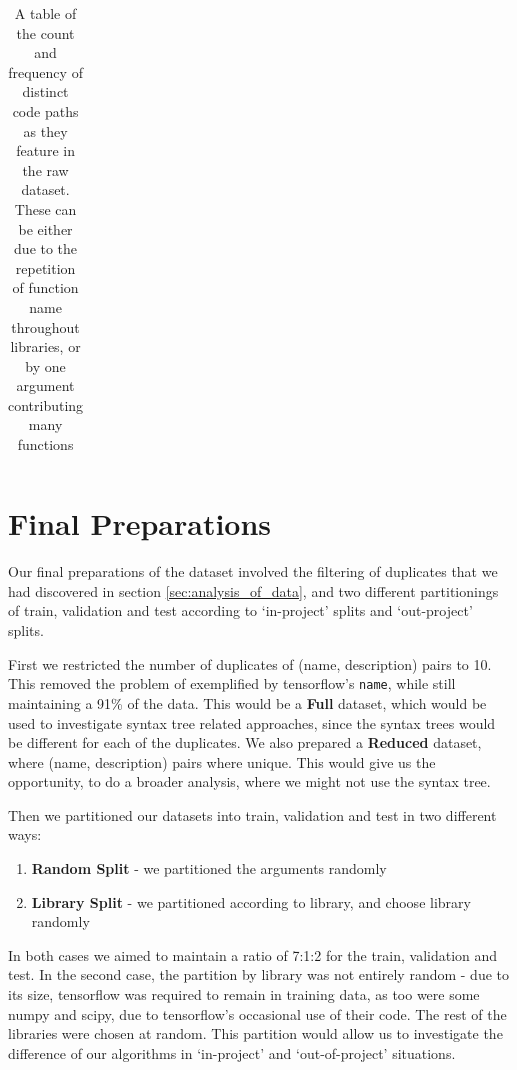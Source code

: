 \begin{table}[p]
\begin{tabular}{c | c | c  }
    \end{tabular}
    \caption { A table of the count and frequency of distinct code paths as they feature in the raw dataset. 
        These can be either due to the repetition of function name throughout libraries, or by one argument contributing many functions }
    \label{table:paths_per_point} 

\end{table}


\section{Final Preparations} %
\label{sec:final_preparations}

Our final preparations of the dataset involved the filtering of duplicates that we had discovered in section \ref{sec:analysis_of_data}, and two different partitionings of train, validation and test according to `in-project' splits and `out-project' splits.

First we restricted the number of duplicates of (name, description) pairs to 10. This removed the problem of exemplified by tensorflow's \texttt{name}, while still maintaining a 91\% of the data. This would be a \textbf{Full} dataset, which would be used to investigate syntax tree related approaches, since the syntax trees would be different for each of the duplicates.
We also prepared a \textbf{Reduced} dataset, where (name, description) pairs where unique. This would give us the opportunity, to do a broader analysis, where we might not use the syntax tree.

Then we partitioned our datasets into train, validation and test in two different ways:
\begin{enumerate}
    \item \textbf{Random Split} - we partitioned the arguments randomly
    \item \textbf{Library Split} - we partitioned according to library, and choose library randomly
\end{enumerate}

In both cases we aimed to maintain a ratio of 7:1:2 for the train, validation and test. In the second case, the partition by library was not entirely random - due to its size, tensorflow was required to remain in training data, as too were some numpy and scipy, due to tensorflow's occasional use of their code. The rest of the libraries were chosen at random. This partition would allow us to investigate the difference of our algorithms in `in-project' and `out-of-project' situations.

